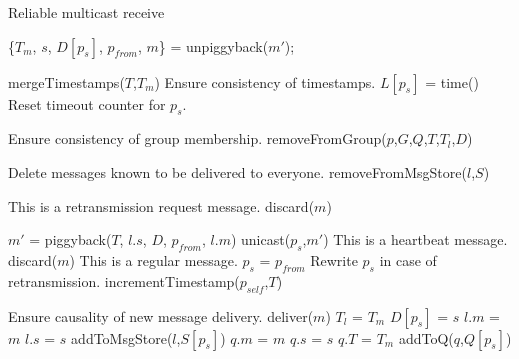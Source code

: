 \documentclass[]{article}
\begin{document}
\begin{algorithm}
\caption{Reliable multicast receive}
\label{alg:rcv}
\begin{algorithmic}[1]
\State \{$T_m$, $s$, $D[p_s]$, $p_{from}$, $m$\} = unpiggyback($m'$);

\State mergeTimestamps($T$,$T_m$) \Comment Ensure consistency of timestamps.
\State $L[p_s]$ = time() \Comment Reset timeout counter for $p_s$.

\State \Comment Ensure consistency of group membership.
	\State removeFromGroup($p$,$G$,$Q$,$T$,$T_l$,$D$)
\EndFor

\State \Comment Delete messages known to be delivered to everyone.
	\State removeFromMsgStore($l$,$S$)
\EndFor

	\Comment This is a retransmission request message.
	\State discard($m$)
	
		\State $m'$ = piggyback($T$, $l.s$, $D$, $p_{from}$, $l.m$)
		\State unicast($p_s$,$m'$)
	\EndFor
{}
	\Comment This is a heartbeat message.
	\State discard($m$)
\Else
	\Comment This is a regular message.
	\State $p_s$ = $p_{from}$ \Comment Rewrite $p_s$ in case of retransmission.
		\State incrementTimestamp($p_{self}$,$T$)
		
			\Comment Ensure causality of new message delivery.
			\State deliver($m$)
			\State $T_l$ = $T_m$
			\State $D[p_s]$ = $s$
			\State $l.m$ = $m$
			\State $l.s$ = $s$
			\State addToMsgStore($l$,$S[p_s]$)
		\Else
			\State $q.m$ = $m$
			\State $q.s$ = $s$
			\State $q.T$ = $T_m$
			\State addToQ($q$,$Q[p_s]$)
		\EndIf
\end{algorithmic}
\end{algorithm}
\end{document}
